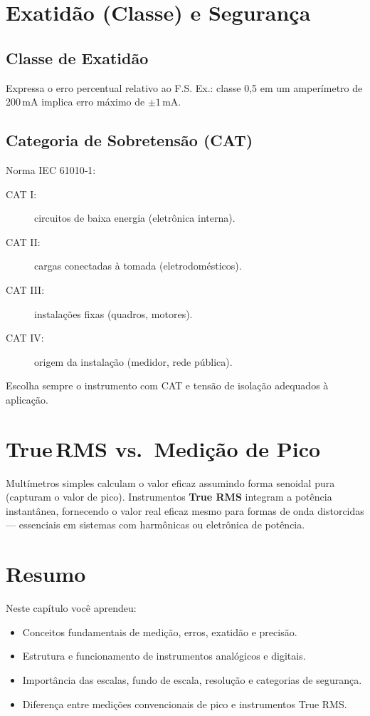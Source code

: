 \section{Exatidão (Classe) e Segurança}

\subsection{Classe de Exatidão}
Expressa o erro percentual relativo ao F.S.  
Ex.: classe 0,5 em um amperímetro de 200 mA implica erro máximo de $\pm1$ mA.

\subsection{Categoria de Sobretensão (CAT)}
Norma IEC 61010‑1:
\begin{description}
  \item[CAT I:] circuitos de baixa energia (eletrônica interna).  
  \item[CAT II:] cargas conectadas à tomada (eletrodomésticos).  
  \item[CAT III:] instalações fixas (quadros, motores).  
  \item[CAT IV:] origem da instalação (medidor, rede pública).  
\end{description}

Escolha sempre o instrumento com CAT e tensão de isolação adequados à aplicação.

\section{True\,RMS vs.\ Medição de Pico}
Multímetros simples calculam o valor eficaz assumindo forma senoidal pura (capturam o valor de pico). Instrumentos \textbf{True RMS} integram a potência instantânea, fornecendo o valor real eficaz mesmo para formas de onda distorcidas — essenciais em sistemas com harmônicas ou eletrônica de potência.

\section{Resumo}
Neste capítulo você aprendeu:
\begin{itemize}
  \item Conceitos fundamentais de medição, erros, exatidão e precisão.
  \item Estrutura e funcionamento de instrumentos analógicos e digitais.
  \item Importância das escalas, fundo de escala, resolução e categorias de segurança.
  \item Diferença entre medições convencionais de pico e instrumentos True RMS.
\end{itemize}

